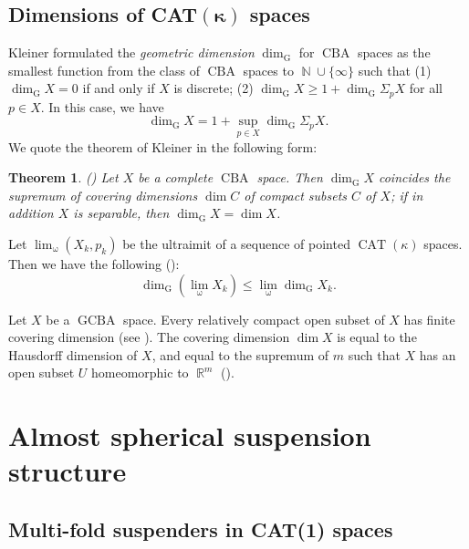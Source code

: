 \documentclass[a4paper,12pt]{amsart}
\newcommand{\CAT}{\operatorname{CAT}}
\newcommand{\CBA}{\operatorname{CBA}}
\newcommand{\GCBA}{\operatorname{GCBA}}
\newcommand{\ulim}{\operatorname{\lim_{\omega}}}
\newcommand{\R}{\operatorname{\mathbb{R}}}
\newcommand{\N}{\operatorname{\mathbb{N}}}
\numberwithin{equation}{section}
\theoremstyle{plain}
\newtheorem{thm}{Theorem}[section]
\theoremstyle{definition}
\theoremstyle{remark}
\begin{document}
\subsection{Dimensions of CAT$\boldsymbol{(\kappa)}$ spaces}

Kleiner \cite{kleiner} formulated
the \emph{geometric dimension} $\dim_{\mathrm{G}}$ 
for $\CBA$ spaces
as
the smallest function from the class of $\CBA$ spaces
to $\N \cup \{\infty\}$
such that
(1) $\dim_{\mathrm{G}} X = 0$ if and only if $X$ is discrete;
(2) $\dim_{\mathrm{G}} X \ge 1 + \dim_{\mathrm{G}} \Sigma_pX$ 
for all $p \in X$.
In this case,
we have
\[
\dim_{\mathrm{G}} X = 1 + \sup_{p \in X} \dim_{\mathrm{G}} \Sigma_pX.
\]
We quote the theorem of Kleiner \cite[Theorem A]{kleiner}
in the following form:

\begin{thm}
\label{thm: dimgdimt}
\emph{(\cite{kleiner})} 
Let $X$ be a complete $\CBA$ space.
Then $\dim_{\mathrm{G}} X$ coincides the supremum
of covering dimensions $\dim C$ of compact subsets $C$ of $X$;
if in addition $X$ is separable,
then $\dim_{\mathrm{G}} X = \dim X$.
\end{thm}

Let $\ulim (X_k,p_k)$ be the ultraimit of a sequence of 
pointed $\CAT(\kappa)$ spaces.
Then we have the following (\cite[Lemma 11.1]{lytchak2}):
\begin{equation}
\dim_{\mathrm{G}} \left( \ulim X_k \right) 
\le \ulim \dim_{\mathrm{G}} X_k.
\label{eqn: lscdim}
\end{equation}

Let $X$ be a $\GCBA$ space.
Every relatively compact open subset of $X$
has finite covering dimension
(see \cite[Subsection 5.3]{lytchak-nagano1}).
The covering dimension $\dim X$ 
is equal to the Hausdorff dimension of $X$,
and equal to the supremum of $m$
such that $X$ has an open subset $U$ homeomorphic to $\R^m$
(\cite[Theorem 1.1]{lytchak-nagano1}).

\section{Almost spherical suspension structure}

\subsection{Multi-fold suspenders in CAT(1) spaces}
\end{document}
